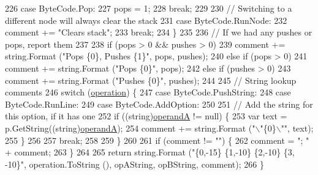 \begin{DoxyCode}
226             \textcolor{keywordflow}{case} ByteCode.Pop:
227                 pops = 1;
228                 \textcolor{keywordflow}{break};
229             
230             \textcolor{comment}{// Switching to a different node will always clear the stack}
231             \textcolor{keywordflow}{case} ByteCode.RunNode:
232                 comment += \textcolor{stringliteral}{"Clears stack"};
233                 \textcolor{keywordflow}{break};
234             \}
235 
236             \textcolor{comment}{// If we had any pushes or pops, report them}
237 
238             \textcolor{keywordflow}{if} (pops > 0 && pushes > 0)
239                 comment += string.Format (\textcolor{stringliteral}{"Pops \{0\}, Pushes \{1\}"}, pops, pushes);
240             \textcolor{keywordflow}{else} \textcolor{keywordflow}{if} (pops > 0)
241                 comment += string.Format (\textcolor{stringliteral}{"Pops \{0\}"}, pops);
242             \textcolor{keywordflow}{else} \textcolor{keywordflow}{if} (pushes > 0)
243                 comment += string.Format (\textcolor{stringliteral}{"Pushes \{0\}"}, pushes);
244 
245             \textcolor{comment}{// String lookup comments}
246             \textcolor{keywordflow}{switch} (\hyperlink{a00095_a566bf5f7198cc353ea5c3710cb3a31cb}{operation}) \{
247             \textcolor{keywordflow}{case} ByteCode.PushString:
248             \textcolor{keywordflow}{case} ByteCode.RunLine:
249             \textcolor{keywordflow}{case} ByteCode.AddOption:
250 
251                 \textcolor{comment}{// Add the string for this option, if it has one}
252                 \textcolor{keywordflow}{if} ((\textcolor{keywordtype}{string})\hyperlink{a00095_ab5d386faa0d3dbc23db80f8e62706afd}{operandA} != null) \{
253                     var text = p.GetString((string)\hyperlink{a00095_ab5d386faa0d3dbc23db80f8e62706afd}{operandA});
254                     comment += string.Format (\textcolor{stringliteral}{"\(\backslash\)"\{0\}\(\backslash\)""}, text);
255                 \}
256 
257                 \textcolor{keywordflow}{break};
258             
259             \}
260 
261             \textcolor{keywordflow}{if} (comment != \textcolor{stringliteral}{""}) \{
262                 comment = \textcolor{stringliteral}{"; "} + comment;
263             \}
264 
265             \textcolor{keywordflow}{return} string.Format (\textcolor{stringliteral}{"\{0,-15\} \{1,-10\} \{2,-10\} \{3, -10\}"}, operation.ToString (), opAString, 
      opBString, comment);
266         \}
\end{DoxyCode}


